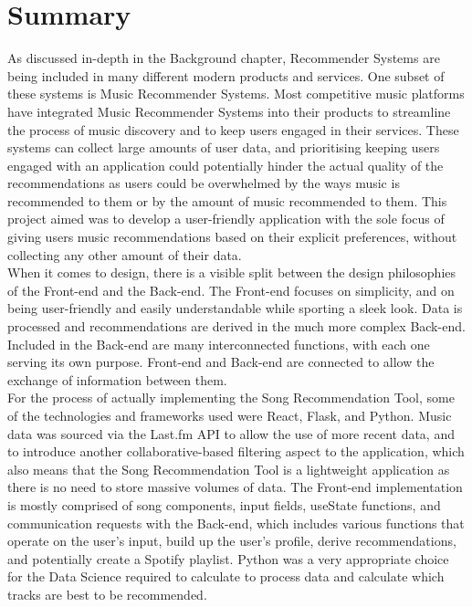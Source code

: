 \documentclass{l4proj}
\begin{document}
\section{Summary}
As discussed in-depth in the Background chapter, Recommender Systems are being included in many different modern products and services. One subset of these systems is Music Recommender Systems. Most competitive music platforms have integrated Music Recommender Systems into their products to streamline the process of music discovery and to keep users engaged in their services. These systems can collect large amounts of user data, and prioritising keeping users engaged with an application could potentially hinder the actual quality of the recommendations as users could be overwhelmed by the ways music is recommended to them or by the amount of music recommended to them. This project aimed was to develop a user-friendly application with the sole focus of giving users music recommendations based on their explicit preferences, without collecting any other amount of their data.\\[8pt]
When it comes to design, there is a visible split between the design philosophies of the Front-end and the Back-end. The Front-end focuses on simplicity, and on being user-friendly and easily understandable while sporting a sleek look. Data is processed and recommendations are derived in the much more complex Back-end. Included in the Back-end are many interconnected functions, with each one serving its own purpose. Front-end and Back-end are connected to allow the exchange of information between them.\\[8pt]
For the process of actually implementing the Song Recommendation Tool, some of the technologies and frameworks used were React, Flask, and Python. Music data was sourced via the Last.fm API to allow the use of more recent data, and to introduce another collaborative-based filtering aspect to the application, which also means that the Song Recommendation Tool is a lightweight application as there is no need to store massive volumes of data. The Front-end implementation is mostly comprised of song components, input fields, useState functions, and communication requests with the Back-end, which includes various functions that operate on the user's input, build up the user's profile, derive recommendations, and potentially create a Spotify playlist. Python was a very appropriate choice for the Data Science required to calculate to process data and calculate which tracks are best to be recommended.\\[8pt]
\end{document}
